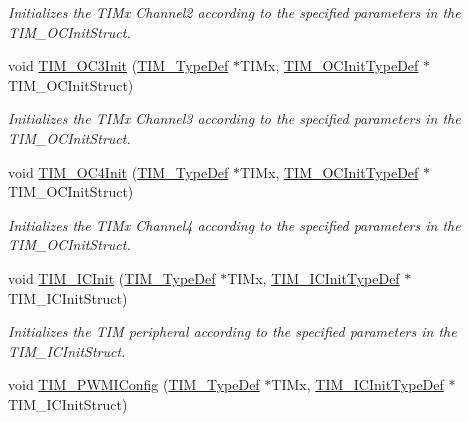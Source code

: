 \begin{DoxyCompactItemize}
\begin{DoxyCompactList}\small\item\em Initializes the T\+I\+Mx Channel2 according to the specified parameters in the T\+I\+M\+\_\+\+O\+C\+Init\+Struct. \end{DoxyCompactList}\item 
void \mbox{\hyperlink{group___t_i_m___private___functions_ga90d4a358d4e6d4c5ed17dc1d6beb5f30}{T\+I\+M\+\_\+\+O\+C3\+Init}} (\mbox{\hyperlink{struct_t_i_m___type_def}{T\+I\+M\+\_\+\+Type\+Def}} $\ast$T\+I\+Mx, \mbox{\hyperlink{struct_t_i_m___o_c_init_type_def}{T\+I\+M\+\_\+\+O\+C\+Init\+Type\+Def}} $\ast$T\+I\+M\+\_\+\+O\+C\+Init\+Struct)
\begin{DoxyCompactList}\small\item\em Initializes the T\+I\+Mx Channel3 according to the specified parameters in the T\+I\+M\+\_\+\+O\+C\+Init\+Struct. \end{DoxyCompactList}\item 
void \mbox{\hyperlink{group___t_i_m___private___functions_ga64571ebbb58cac39a9e760050175f11c}{T\+I\+M\+\_\+\+O\+C4\+Init}} (\mbox{\hyperlink{struct_t_i_m___type_def}{T\+I\+M\+\_\+\+Type\+Def}} $\ast$T\+I\+Mx, \mbox{\hyperlink{struct_t_i_m___o_c_init_type_def}{T\+I\+M\+\_\+\+O\+C\+Init\+Type\+Def}} $\ast$T\+I\+M\+\_\+\+O\+C\+Init\+Struct)
\begin{DoxyCompactList}\small\item\em Initializes the T\+I\+Mx Channel4 according to the specified parameters in the T\+I\+M\+\_\+\+O\+C\+Init\+Struct. \end{DoxyCompactList}\item 
void \mbox{\hyperlink{group___t_i_m___private___functions_ga9e6a153dd6552e4e1188eba227316f7f}{T\+I\+M\+\_\+\+I\+C\+Init}} (\mbox{\hyperlink{struct_t_i_m___type_def}{T\+I\+M\+\_\+\+Type\+Def}} $\ast$T\+I\+Mx, \mbox{\hyperlink{struct_t_i_m___i_c_init_type_def}{T\+I\+M\+\_\+\+I\+C\+Init\+Type\+Def}} $\ast$T\+I\+M\+\_\+\+I\+C\+Init\+Struct)
\begin{DoxyCompactList}\small\item\em Initializes the T\+IM peripheral according to the specified parameters in the T\+I\+M\+\_\+\+I\+C\+Init\+Struct. \end{DoxyCompactList}\item 
void \mbox{\hyperlink{group___t_i_m___private___functions_gaa71f9296556310f85628d6c748a06475}{T\+I\+M\+\_\+\+P\+W\+M\+I\+Config}} (\mbox{\hyperlink{struct_t_i_m___type_def}{T\+I\+M\+\_\+\+Type\+Def}} $\ast$T\+I\+Mx, \mbox{\hyperlink{struct_t_i_m___i_c_init_type_def}{T\+I\+M\+\_\+\+I\+C\+Init\+Type\+Def}} $\ast$T\+I\+M\+\_\+\+I\+C\+Init\+Struct)

\end{DoxyCompactItemize}
